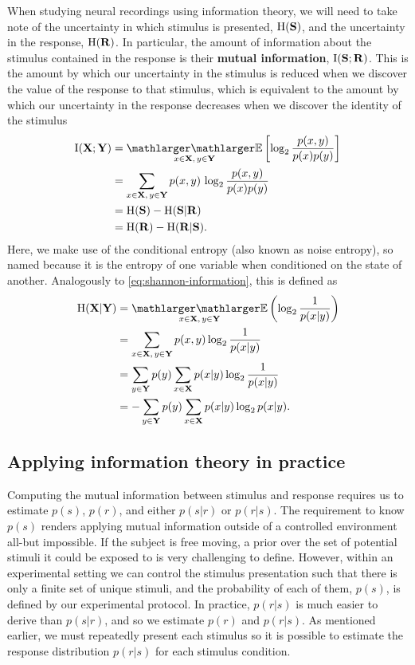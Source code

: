 When studying neural recordings using information theory, we will need to take note of the uncertainty in which stimulus is presented, $\operatorname{H}(\mathbf{S})$, and the uncertainty in the response, $\operatorname{H}(\mathbf{R})$.
In particular, the amount of information about the stimulus contained in the response is their \textbf{mutual information}, $\operatorname{I}(\mathbf{S};\mathbf{R})$.
This is the amount by which our uncertainty in the stimulus is reduced when we discover the value of the response to that stimulus, which is equivalent to the amount by which our uncertainty in the response decreases when we discover the identity of the stimulus
\begin{align}
\I(\SET{X};\SET{Y})
  &= \EE_{x \in \SET{X}, \, y \in \SET{Y}} \left[ \log_2 \frac{p(x,y)}{p(x)p(y)} \right] \notag
\\&= \sum_{x \in \SET{X}, \, y \in \SET{Y}} p(x,y) \, \log_2 \frac{p(x,y)}{p(x)p(y)} \notag
\\&= \HH(\SET{S}) - \HH(\SET{S} | \SET{R}) \notag
\\&= \HH(\SET{R}) - \HH(\SET{R} | \SET{S}) \label{eq:info}
.\end{align}
Here, we make use of the conditional entropy (also known as noise entropy), so named because it is the entropy of one variable when conditioned on the state of another.
Analogously to \autoref{eq:shannon-information}, this is defined as
\begin{align}
\HH(\SET{X} | \SET{Y})
  &= \EE_{x \in \SET{X}, \, y \in \SET{Y}} \left( \log_2 \frac{1}{p(x|y)} \right) \notag
\\&= \sum_{x \in \SET{X}, \, y \in \SET{Y}} p(x,y) \log_2 \frac{1}{p(x|y)} \notag
\\&= \sum_{y \in \SET{Y}} p(y) \sum_{x \in \SET{X}} p(x|y) \log_2 \frac{1}{p(x|y)} \notag
\\&= - \sum_{y \in \SET{Y}} p(y) \sum_{x \in \SET{X}} p(x|y) \log_2 p(x|y)
.\end{align}


\subsection{Applying information theory in practice}

Computing the mutual information between stimulus and response requires us to estimate $p(s)$, $p(r)$, and either $p(s|r)$ or $p(r|s)$.
The requirement to know $p(s)$ renders applying mutual information outside of a controlled environment all-but impossible.
If the subject is free moving, a prior over the set of potential stimuli it could be exposed to is very challenging to define.
However, within an experimental setting we can control the stimulus presentation such that there is only a finite set of unique stimuli, and the probability of each of them, $p(s)$, is defined by our experimental protocol.
In practice, $p(r|s)$ is much easier to derive than $p(s|r)$, and so we estimate $p(r)$ and $p(r|s)$.
As mentioned earlier, we must repeatedly present each stimulus so it is possible to estimate the response distribution $p(r|s)$ for each stimulus condition.

